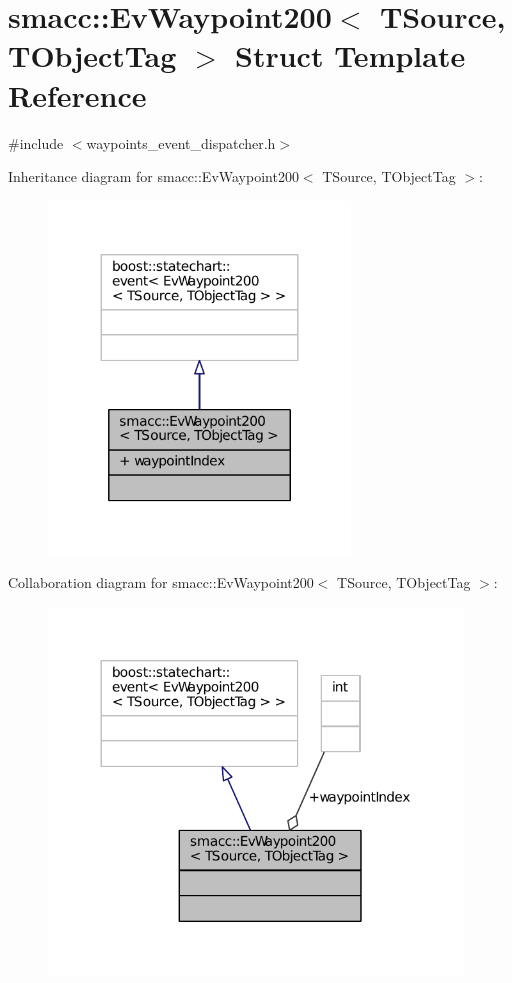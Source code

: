 \hypertarget{structsmacc_1_1EvWaypoint200}{}\section{smacc\+:\+:Ev\+Waypoint200$<$ T\+Source, T\+Object\+Tag $>$ Struct Template Reference}
\label{structsmacc_1_1EvWaypoint200}


{\ttfamily \#include $<$waypoints\+\_\+event\+\_\+dispatcher.\+h$>$}



Inheritance diagram for smacc\+:\+:Ev\+Waypoint200$<$ T\+Source, T\+Object\+Tag $>$\+:
\nopagebreak
\begin{figure}[H]
\begin{center}
\leavevmode
\includegraphics[width=227pt]{structsmacc_1_1EvWaypoint200__inherit__graph}
\end{center}
\end{figure}


Collaboration diagram for smacc\+:\+:Ev\+Waypoint200$<$ T\+Source, T\+Object\+Tag $>$\+:
\nopagebreak
\begin{figure}[H]
\begin{center}
\leavevmode
\includegraphics[width=312pt]{structsmacc_1_1EvWaypoint200__coll__graph}
\end{center}
\end{figure}
